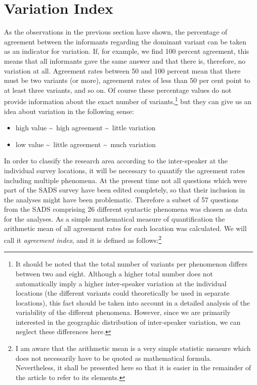 \documentclass[output=paper]{LSP/langsci}
\begin{document}
\section{Variation Index}

As the observations in the previous section have shown, the percentage of agreement between the informants regarding the dominant variant can be taken as an indicator for variation. If, for example, we find 100 percent agreement, this means that all informants gave the same answer and that there is, therefore, no variation at all. Agreement rates between 50 and 100 percent mean that there must be two variants (or more), agreement rates of less than 50 per cent point to at least three variants, and so on. Of course these percentage values do not provide information about the exact number of variants,\footnote{ It should be noted that the total number of variants per phenomenon differs between two and eight. Although a higher total number does not automatically imply a higher inter-speaker variation at the individual locations (the different variants could theoretically be used in separate locations), this fact should be taken into account in a detailed analysis of the variability of the different phenomena. However, since we are primarily interested in the geographic distribution of inter-speaker variation, we can neglect these differences here.} but they can give us an idea about variation in the following sense:

\begin{itemize}
\item high value \textasciitilde ~high agreement \textasciitilde ~little variation
\item low value \textasciitilde ~little agreement \textasciitilde ~much variation
\end{itemize}

In order to classify the research area according to the inter-speaker  at the individual survey locations, it will be necessary to quantify the agreement rates including multiple phenomena. At the present time not all questions which were part of the SADS survey have been edited completely, so that their inclusion in the analyses might have been problematic. Therefore a subset of 57 questions from the SADS comprising 26 different syntactic phenomena was chosen as data for the analyses. As a simple mathematical measure of quantification the arithmetic mean of all agreement rates for each location was calculated. We will call it \emph{agreement index}, and it is defined as follows:\footnote{I am aware that the arithmetic mean is a very simple statistic measure which does not necessarily have to be quoted as mathematical formula. Nevertheless, it shall be presented here so that it is easier in the remainder of the article to refer to its elements.}
\end{document}
